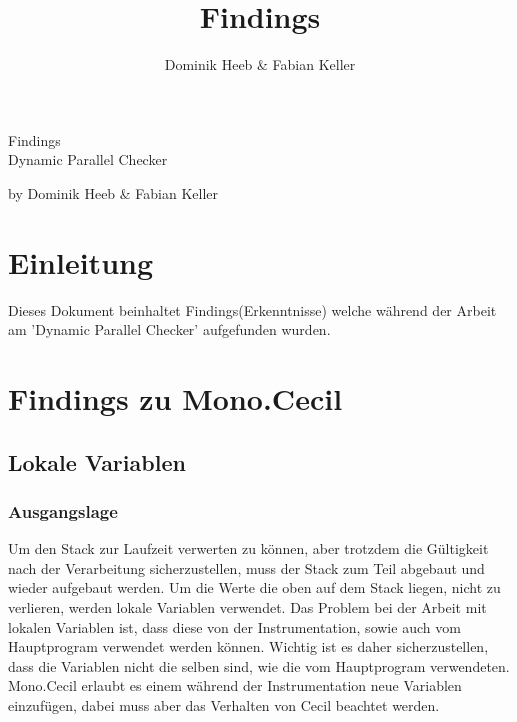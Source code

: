 \documentclass[10pt,a4paper]{article}
\author{Dominik Heeb \& Fabian Keller}
\title{Findings}
\begin{document}
\begin{titlepage}
	\begin{Huge}
		\begin{center}
				Findings \\Dynamic Parallel Checker\\[2.0cm]
		\end{center}
	\end{Huge}
	
	\begin{center}
		\begin{Large}
				by Dominik Heeb \& Fabian Keller\\[1.0cm]
		\end{Large}
	\end{center}
\end{titlepage}

\newpage
\tableofcontents 
\newpage

\section{Einleitung}
\begin{flushleft}
Dieses Dokument beinhaltet Findings(Erkenntnisse) welche während der Arbeit am 'Dynamic Parallel Checker' aufgefunden wurden.
\end{flushleft}
\section{Findings zu Mono.Cecil}
\subsection{Lokale Variablen}
\subsubsection{Ausgangslage}
\begin{flushleft}
Um den Stack zur Laufzeit verwerten zu können, aber trotzdem die Gültigkeit nach der Verarbeitung sicherzustellen, muss der Stack zum Teil abgebaut und wieder aufgebaut werden. Um die Werte die oben auf dem Stack liegen, nicht zu verlieren, werden lokale Variablen verwendet.
Das Problem bei der Arbeit mit lokalen Variablen ist, dass diese von der Instrumentation, sowie auch vom Hauptprogram verwendet werden können. Wichtig ist es daher sicherzustellen, dass die Variablen nicht die selben sind, wie die vom Hauptprogram verwendeten.
Mono.Cecil erlaubt es einem während der Instrumentation neue Variablen einzufügen, dabei muss aber das Verhalten von Cecil beachtet werden.
\end{flushleft}
\end{document}
